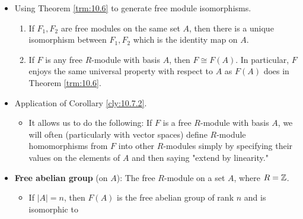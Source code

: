 \documentclass[../notes.tex]{subfiles}
\begin{document}
\begin{itemize}
\begin{theorem}
\begin{figure}[H]
            \caption{Decomposition of a map through a free module.}
            \label{fig:trm10.5}
        \end{figure}
        When $A$ is the finite set $\{a_1,\dots,a_n\}$, $F(A)=Ra_1\oplus\cdots\oplus Ra_n\cong R^n$.
        \begin{proof}
            Given.
        \end{proof}
    \end{theorem}
    \item Using Theorem \ref{trm:10.6} to generate free module isomorphisms.
    \begin{corollary}\label{cly:10.7}\leavevmode
        \begin{enumerate}[ref={\thecorollary(\arabic*)}]
            \item \label{cly:10.7.1}If $F_1,F_2$ are free modules on the same set $A$, then there is a unique isomorphism between $F_1,F_2$ which is the identity map on $A$.
            \item \label{cly:10.7.2}If $F$ is any free $R$-module with basis $A$, then $F\cong F(A)$. In particular, $F$ enjoys the same universal property with respect to $A$ as $F(A)$ does in Theorem \ref{trm:10.6}.
        \end{enumerate}
    \end{corollary}
    \item Application of Corollary \ref{cly:10.7.2}.
    \begin{itemize}
        \item It allows us to do the following: If $F$ is a free $R$-module with basis $A$, we will often (particularly with vector spaces) define $R$-module homomorphisms from $F$ into other $R$-modules simply by specifying their values on the elements of $A$ and then saying "extend by linearity."
    \end{itemize}
    \item \textbf{Free abelian group} (on $A$): The free $R$-module on a set $A$, where $R=\mathbb{Z}$.
    \begin{itemize}
        \item If $|A|=n$, then $F(A)$ is the free abelian group of rank $n$ and is isomorphic to
        \begin{equation*}

\end{equation*}
\end{itemize}
\end{itemize}
\end{document}
